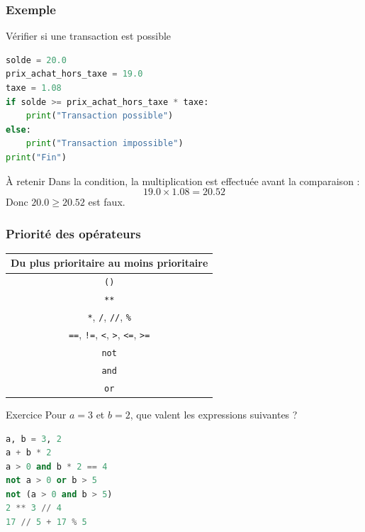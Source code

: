 \documentclass[10pt]{beamer}
\begin{document}
\begin{frame}[containsverbatim]
	\frametitle{Exemple}
	

\begin{exampleblock}{Vérifier si une transaction est possible}
\begin{lstlisting}[language=Python]
solde = 20.0
prix_achat_hors_taxe = 19.0
taxe = 1.08
if solde >= prix_achat_hors_taxe * taxe:
	print("Transaction possible")
else:
	print("Transaction impossible")
print("Fin")
\end{lstlisting}
\end{exampleblock}
	
	
	\vspace{0.1cm}
	
	\begin{block}{À retenir}
		Dans la condition, la multiplication est effectuée avant la comparaison :
		\[
		19.0 \times 1.08 = 20.52
		\]
		Donc $20.0 \geq 20.52$ est faux.
	\end{block}
	
	
\end{frame}
\begin{frame}[containsverbatim]
	\frametitle{Priorité des opérateurs}
	
	
	\begin{center}
		\begin{tabular}{|c|}
			\hline
			\textbf{Du plus prioritaire au moins prioritaire} \\
			\hline
			\texttt{()} \\
			\hline
			\texttt{**} \\
			\hline
			\texttt{*}, \texttt{/}, \texttt{//}, \texttt{\%} \\
			\hline
			\texttt{==}, \texttt{!=}, \texttt{<}, \texttt{>}, \texttt{<=}, \texttt{>=} \\
			\hline
			\texttt{not} \\
			\hline
			\texttt{and} \\
			\hline
			\texttt{or} \\
			\hline
		\end{tabular}
	\end{center}
	
	\vspace{0.15cm}
	
	\begin{exampleblock}{Exercice}
Pour $a=3$ et $b=2$, que valent les expressions suivantes ?

\begin{lstlisting}[language=Python]
a, b = 3, 2
a + b * 2
a > 0 and b * 2 == 4
not a > 0 or b > 5
not (a > 0 and b > 5)
2 ** 3 // 4
17 // 5 + 17 % 5
\end{lstlisting}
\end{exampleblock}
	
\end{frame}
\end{document}
